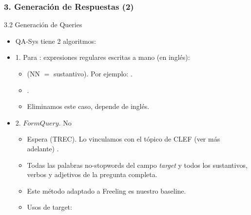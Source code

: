 \begin{frame}
\frametitle{3. Generación de Respuestas (2)}
  \begin{block}{3.2 Generación de Queries}
  \begin{itemize}
      \item QA-Sys tiene 2 algoritmos:
      \item 1. Para : expresiones regulares escritas a mano (en inglés):
      \begin{itemize}
        \item {} (NN $=$ sustantivo). Por ejemplo: . 
        \item {}. 
        \item  Eliminamos este caso, depende de inglés.
      \end{itemize}
      \item 2. $FormQuery$. No 
      \begin{itemize}
        \item Espera  (TREC). Lo vinculamos con el tópico de CLEF (ver más adelante) .
        \item  Todas las palabras no-stopwords del campo \textit{target} y todos los sustantivos, verbos y adjetivos de la pregunta completa.
        \item Este método adaptado a Freeling es nuestro baseline.
        \item Usos de target:
      \end{itemize}
    \end{itemize}
  \end{block}
\end{frame}
